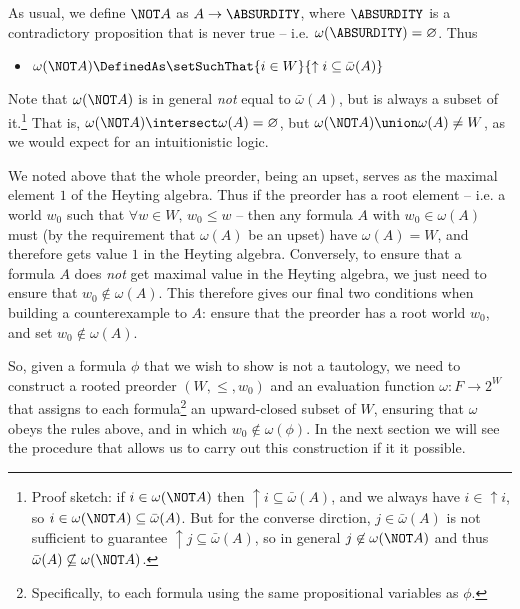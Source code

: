 As usual, we define $\NOT A$ as $A \to \ABSURDITY$, where $\ABSURDITY$ is a contradictory proposition that is never true -- i.e. $\omega(\ABSURDITY) = \varnothing$.  Thus
\begin{itemize}
\item $\omega(\NOT A) \DefinedAs 
\setSuchThat{i \in W}{\uparrow i \subseteq \bar{\omega}(A)}$
\end{itemize}
Note that $\omega(\NOT A)$ is in general \emph{not} equal to $\bar{\omega}(A)$, but is always a subset of it.\footnote{
Proof sketch: if $i \in \omega(\NOT A)$ then $\uparrow i \subseteq \bar{\omega}(A)$, and we always have $i \in \uparrow i$, so 
$i \in \omega(\NOT A) \subseteq \bar{\omega}(A)$.  But for the converse dirction, $j \in \bar{\omega}(A)$ is not sufficient to guarantee $\uparrow j \subseteq \bar{\omega}(A)$, so in general $j \not\in \omega(\NOT A)$ and thus $\bar{\omega}(A) \not\subseteq \omega(\NOT A)$.
}
That is, $\omega(\NOT A) \intersect \omega(A) = \varnothing$, but 
$\omega(\NOT A) \union \omega(A) \neq W$, as we would expect for an intuitionistic logic.

We noted above that the whole preorder, being an upset, serves as the maximal element $1$ of the Heyting algebra.  Thus if the preorder has a root element -- i.e. a world $w_0$ such that $\forall w \in W,\, w_0 \leq w$ -- then any formula $A$ with $w_0 \in \omega(A)$ must (by the requirement that $\omega(A)$ be an upset) have $\omega(A) = W$, and therefore gets value $1$ in the Heyting algebra.  Conversely, to ensure that a formula $A$ does \emph{not} get maximal value in the Heyting algebra, we just need to ensure that $w_0 \not\in \omega(A)$.  This therefore gives our final two conditions when building a counterexample to $A$: ensure that the preorder has a root world $w_0$, and set $w_0 \not\in \omega(A)$.


So, given a formula $\phi$ that we wish to show is not a tautology, we  need to construct a rooted preorder $(W, \leq, w_0)$ and an evaluation function $\omega: F \to 2^W$ that assigns to each formula\footnote{
Specifically, to each formula using the same propositional variables as $\phi$.} 
an upward-closed subset of $W$, ensuring that $\omega$ obeys the rules above, and in which $w_0 \not\in \omega(\phi)$.  In the next section we will see the procedure that allows us to carry out this construction if it it possible.





